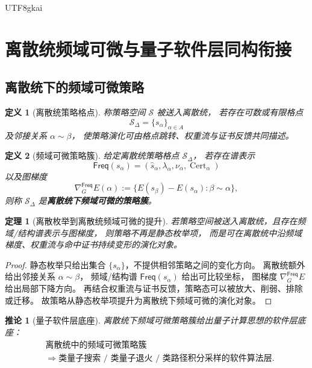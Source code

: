 \documentclass[12pt]{article}
\newtheorem{definition}{定义}[section]
\newtheorem{theorem}{定理}[section]
\newtheorem{corollary}{推论}[section]
\newcommand{\Freq}{\mathsf{Freq}}
\newcommand{\Cert}{\operatorname{Cert}}
\begin{document}
\begin{CJK*}{UTF8}{gkai}
\section{离散统频域可微与量子软件层同构衔接}
\label{sec:tex53-quantum-bridge}

\subsection{离散统下的频域可微策略}
\label{subsec:tex53-discrete-frequency}

\begin{definition}[离散统策略格点]
称策略空间 \(\mathcal S\) 被送入离散统，
若存在可数或有限格点
\[
  \mathcal S_\Delta=\{s_\alpha\}_{\alpha\in A}
\]
及邻接关系 \(\alpha\sim\beta\)，
使策略演化可由格点跳转、权重流与证书反馈共同描述。
\end{definition}

\begin{definition}[频域可微策略簇]
给定离散统策略格点 \(\mathcal S_\Delta\)，
若存在谱表示
\[
  \Freq(s_\alpha)
  =
  (\widehat s_\alpha,\lambda_\alpha,\nu_\alpha,\Cert_\alpha)
\]
以及图梯度
\[
  \nabla_G^\Freq E(\alpha)
  :=
  \{E(s_\beta)-E(s_\alpha):\beta\sim\alpha\},
\]
则称 \(\mathcal S_\Delta\) 是\textbf{离散统下频域可微的策略簇}。
\end{definition}

\begin{theorem}[离散枚举到离散统频域可微的提升]
\label{thm:tex53-discrete-frequency}
若策略空间被送入离散统，且存在频域/结构谱表示与图梯度，
则策略不再是静态枚举项，
而是可在离散统中沿频域梯度、权重流与命中证书持续变形的演化对象。
\end{theorem}

\begin{proof}
静态枚举只给出集合 \(\{s_\alpha\}\)，不提供相邻策略之间的变化方向。
离散统额外给出邻接关系 \(\alpha\sim\beta\)，
频域/结构谱 \(\Freq(s_\alpha)\) 给出可比较坐标，
图梯度 \(\nabla_G^\Freq E\) 给出局部下降方向。
再结合权重流与证书反馈，策略态可以被放大、削弱、排除或迁移。
故策略从静态枚举项提升为离散统下频域可微的演化对象。
\end{proof}

\begin{corollary}[量子软件层底座]
离散统下频域可微策略簇给出量子计算思想的软件层底座：
\[
  \boxed{
    \begin{aligned}
      &\text{离散统中的频域可微策略簇}\\
      &\Longrightarrow
      \text{类量子搜索 / 类量子退火 / 类路径积分采样的软件算法层}.
    \end{aligned}
  }
\]
\end{corollary}


\end{CJK*}
\end{document}
